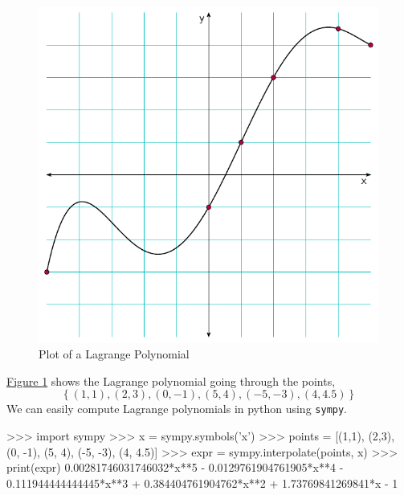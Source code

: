 \begin{figure}[!htpb]
\centering
\includegraphics[scale=0.75]{polynomials/figures/lagrange_poly_plot1.pdf}
\caption{Plot of a Lagrange Polynomial}
\label{fig:lagrange_poly_plot1}
\end{figure}

\hyperref[fig:lagrange_poly_plot1]{Figure \ref{fig:lagrange_poly_plot1}} shows the Lagrange polynomial going through 
the points, 
\[ \left\{(1,1), (2,3), (0, -1), (5, 4), (-5, -3), (4, 4.5) \right\}\] 
We can easily compute Lagrange polynomials in python using \texttt{sympy}.

\begin{pycon}
>>> import sympy
>>> x = sympy.symbols('x')
>>> points = [(1,1), (2,3), (0, -1), (5, 4), (-5, -3), (4, 4.5)]
>>> expr = sympy.interpolate(points, x)
>>> print(expr)
0.00281746031746032*x**5 - 0.0129761904761905*x**4 - 0.111944444444445*x**3 + 0.384404761904762*x**2 + 1.73769841269841*x - 1
\end{pycon}


